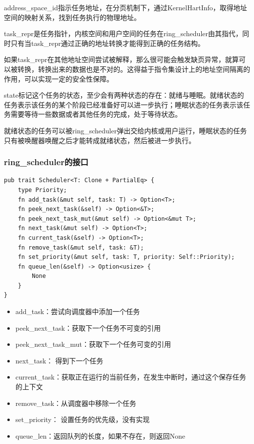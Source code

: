address\_space\_id指示任务地址，在分页机制下，通过KernelHartInfo，取得地址空间的映射关系，找到任务执行的物理地址。

task\_repr是任务指针，内核空间和用户空间的任务在ring\_scheduler由其指代，同时只有当task\_repr通过正确的地址转换才能得到正确的任务结构。

如果task\_repr在其他地址空间尝试被解释，那么很可能会触发缺页异常，就算可以被转换，转换出来的数据也是不对的。这得益于指令集设计上的地址空间隔离的作用，可以实现一定的安全性保障。


state标记这个任务的状态，至少会有两种状态的存在：就绪与睡眠。就绪状态的任务表示该任务的某个阶段已经准备好可以进一步执行；睡眠状态的任务表示该任务需要等待一些数据或者其他任务的完成，处于等待状态。

就绪状态的任务可以被ring\_scheduler弹出交给内核或用户运行，睡眠状态的任务只有被唤醒器唤醒之后才能转成就绪状态，然后被进一步执行。

\subsubsection{ring\_scheduler的接口}

\begin{lstlisting}[caption=调度器的接口约束]
pub trait Scheduler<T: Clone + PartialEq> {
    type Priority;
    fn add_task(&mut self, task: T) -> Option<T>;
    fn peek_next_task(&self) -> Option<&T>;
    fn peek_next_task_mut(&mut self) -> Option<&mut T>;
    fn next_task(&mut self) -> Option<T>;
    fn current_task(&self) -> Option<T>;
    fn remove_task(&mut self, task: &T);
    fn set_priority(&mut self, task: T, priority: Self::Priority);
    fn queue_len(&self) -> Option<usize> {
        None
    }
}
\end{lstlisting}


\begin{itemize}
\item add\_task：尝试向调度器中添加一个任务
\item peek\_next\_task：获取下一个任务不可变的引用
\item peek\_next\_task\_mut：获取下一个任务可变的引用
\item next\_task： 得到下一个任务
\item current\_task：获取正在运行的当前任务，在发生中断时，通过这个保存任务的上下文
\item remove\_task：从调度器中移除一个任务
\item set\_priority： 设置任务的优先级，没有实现
\item queue\_len：返回队列的长度，如果不存在，则返回None
\end{itemize}



